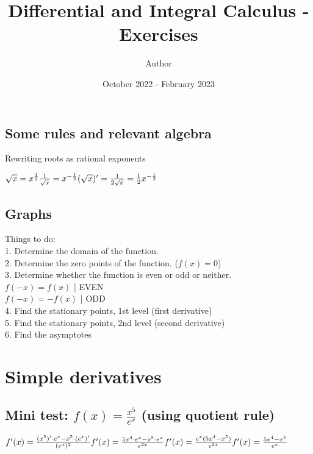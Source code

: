 \documentclass{article}
\title{Differential and Integral Calculus - Exercises}
\author{Author}
\date{October 2022 - February 2023}
\begin{document}
\maketitle

\subsection{Some rules and relevant algebra}
Rewriting roots as rational exponents

$
\\
\sqrt{x} = x^{\frac{1}{2}}
\\
\\
\frac{1}{\sqrt{x}} = x^{-\frac{1}{2}}
\\
\\
(\sqrt{x})' = \frac{1}{2\sqrt{x}} = \frac{1}{2}x^{-\frac{1}{2}}
$

\subsection{Graphs}
Things to do:
\\
1. Determine the domain of the function.
\\
2. Determine the zero points of the function. ($f(x) = 0$)
\\
3. Determine whether the function is even or odd or neither.
\\
$f(-x) = f(x)$ | EVEN
\\
$f(-x) = -f(x)$ | ODD
\\
4. Find the stationary points, 1st level (first derivative)
\\
5. Find the stationary points, 2nd level (second derivative)
\\
6. Find the asymptotes

\pagebreak

\section{Simple derivatives}

\subsection{Mini test: $f(x) = \frac{x^5}{e^x}$ (using quotient rule)}
$
  f'(x) = \frac{(x^5)' \cdot e^x - x^5 \cdot (e^x)'}{(e^x)^2}
  \\
  \\
  f'(x) = \frac{5x^4 \cdot e^x - x^5 \cdot e^x}{e^{2x}}
  \\
  \\
  f'(x) = \frac{e^x (5x^4 - x^5)}{e^{2x}}
  \\
  \\
  f'(x) = \frac{5x^4 - x^5}{e^x}
$
\end{document}

